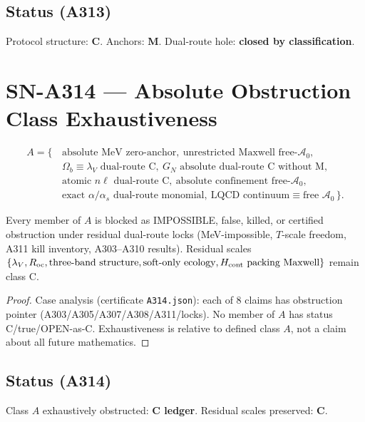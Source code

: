 \subsection*{Status (A313)}
Protocol structure: \textbf{C}. Anchors: \textbf{M}. Dual-route hole: \textbf{closed by classification}.

\section{SN-A314 --- Absolute Obstruction Class Exhaustiveness}
\label{sec:SN-A314}

\begin{definition}
\begin{equation}
\begin{aligned}
A=\{\,&\text{absolute MeV zero-anchor},\ 
\text{unrestricted Maxwell free-}\mathcal{A}_0,\\
&\Omega_b\equiv\lambda_V\text{ dual-route C},\ 
G_N\text{ absolute dual-route C without M},\\
&\text{atomic }n\ell\text{ dual-route C},\ 
\text{absolute confinement free-}\mathcal{A}_0,\\
&\text{exact }\alpha/\alpha_s\text{ dual-route monomial},\ 
\text{LQCD continuum}\equiv\text{free }\mathcal{A}_0\,\}.
\end{aligned}
\end{equation}
\end{definition}

\begin{theorem}[Exhaustiveness on class $A$]
\label{thm:A314}
Every member of $A$ is blocked as IMPOSSIBLE, false, killed, or certified obstruction
under residual dual-route locks (MeV-impossible, $T$-scale freedom, A311 kill inventory,
A303--A310 results). Residual scales $\{\lambda_V,R_{\mathrm{oc}},\text{three-band structure},
\text{soft-only ecology},H_{\rm cont}\text{ packing Maxwell}\}$ remain class C.
\end{theorem}

\begin{proof}
Case analysis (certificate \texttt{A314.json}): each of 8 claims has obstruction pointer
(A303/A305/A307/A308/A311/locks). No member of $A$ has status C/true/OPEN-as-C.
Exhaustiveness is relative to defined class $A$, not a claim about all future mathematics.
\end{proof}

\subsection*{Status (A314)}
Class $A$ exhaustively obstructed: \textbf{C ledger}. Residual scales preserved: \textbf{C}.

